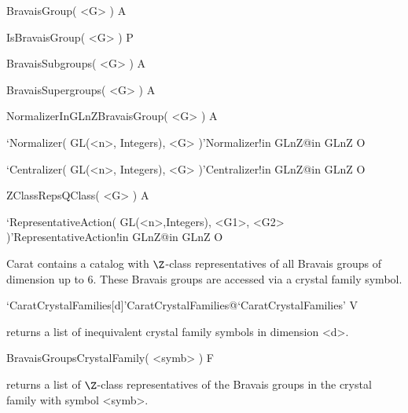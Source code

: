 \>BravaisGroup( <G> ) A

\>IsBravaisGroup( <G> ) P

\>BravaisSubgroups( <G> ) A

\>BravaisSupergroups( <G> ) A

\>NormalizerInGLnZBravaisGroup( <G> ) A

\>`Normalizer( GL(<n>, Integers), <G> )'{Normalizer!in GLnZ}@{in GLnZ} O

\>`Centralizer( GL(<n>, Integers), <G> )'{Centralizer!in GLnZ}@{in GLnZ} O

\>ZClassRepsQClass( <G> ) A

\>`RepresentativeAction( GL(<n>,Integers), <G1>, <G2> )'{RepresentativeAction!in GLnZ}@{in GLnZ} O



Carat contains a catalog with $\Z$-class representatives of all
Bravais groups of dimension up to 6. These Bravais groups are
accessed via a crystal family symbol.

\>`CaratCrystalFamilies[d]'{CaratCrystalFamilies}@{`CaratCrystalFamilies'} V

returns a list of inequivalent crystal family symbols in dimension <d>.

\>BravaisGroupsCrystalFamily( <symb> ) F

returns a list of $\Z$-class representatives of the Bravais groups
in the crystal family with symbol <symb>.


